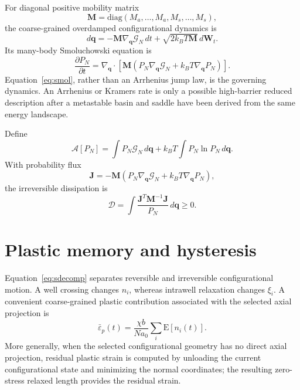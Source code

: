 \documentclass[11pt]{article}
\newcommand{\Eop}{\mathrm{E}}
\begin{document}
For diagonal positive mobility matrix
\begin{equation}
 \bm M=\mathrm{diag}(M_a,\ldots,M_a,M_s,\ldots,M_s),
\end{equation}
the coarse-grained overdamped configurational dynamics is
\begin{equation}
 d\bm q
 =
 -\bm M\nabla_{\bm q}\mathcal G_N\,dt
 +
 \sqrt{2k_BT\bm M}\,d\bm W_t .
 \label{eq:langevin}
\end{equation}
Its many-body Smoluchowski equation is
\begin{equation}
 \boxed{
 \frac{\partial P_N}{\partial t}
 =
 \nabla_{\bm q}\cdot
 \left[
 \bm M
 \left(
 P_N\nabla_{\bm q}\mathcal G_N
 +k_BT\nabla_{\bm q}P_N
 \right)
 \right].
 }
 \label{eq:smol}
\end{equation}
Equation~\eqref{eq:smol}, rather than an Arrhenius jump law, is the governing dynamics. An Arrhenius or Kramers rate is only a possible high-barrier reduced description after a metastable basin and saddle have been derived from the same energy landscape.

Define
\begin{equation}
 \mathcal A[P_N]
 =
 \int P_N\mathcal G_N\,d\bm q
 +
 k_BT\int P_N\ln P_N\,d\bm q.
\end{equation}
With probability flux
\begin{equation}
 \bm J
 =
 -\bm M\left(P_N\nabla_{\bm q}\mathcal G_N+k_BT\nabla_{\bm q}P_N\right),
\end{equation}
the irreversible dissipation is
\begin{equation}
 \boxed{
 \mathcal D
 =
 \int \frac{\bm J^T\bm M^{-1}\bm J}{P_N}\,d\bm q\ge0.
 }
 \label{eq:dissipation}
\end{equation}

\section{Plastic memory and hysteresis}
Equation~\eqref{eq:sdecomp} separates reversible and irreversible configurational motion. A well crossing changes $n_i$, whereas intrawell relaxation changes $\xi_i$. A convenient coarse-grained plastic contribution associated with the selected axial projection is
\begin{equation}
 \bar\varepsilon_p(t)
 =
 \frac{\chi b}{Na_0}\sum_i \Eop[n_i(t)].
 \label{eq:plastic}
\end{equation}
More generally, when the selected configurational geometry has no direct axial projection, residual plastic strain is computed by unloading the current configurational state and minimizing the normal coordinates; the resulting zero-stress relaxed length provides the residual strain.
\end{document}
